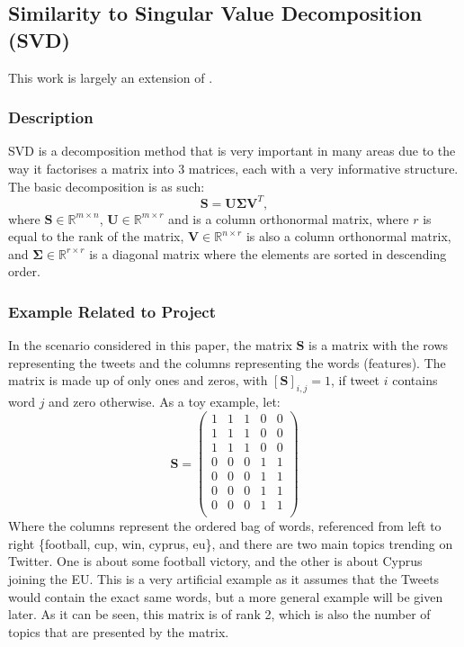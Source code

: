 \documentclass[11pt,a4paper]{article}
\begin{document}
\subsection{Similarity to Singular Value Decomposition (SVD)}
This work is largely an extension of \cite{lecture_svd}.

\subsubsection{Description}
SVD is a decomposition method that is very important in many areas due to the way it factorises a matrix into 3 matrices, each with a very informative structure. The basic decomposition is as such:
\begin{equation}
\mathbf{S} = \mathbf{U}\mathbf{\Sigma}\mathbf{V}^T,
\end{equation}
where $\mathbf{S} \in \mathbb{R}^{m \times n}$,  $\mathbf{U} \in \mathbb{R}^{m \times r}$ and is a column orthonormal matrix, where $r$ is equal to the rank of the matrix,  $\mathbf{V} \in \mathbb{R}^{n \times r}$ is also a column orthonormal matrix, and  $\mathbf{\Sigma} \in \mathbb{R}^{r \times r}$ is a diagonal matrix where the elements are sorted in descending order.

\subsubsection{Example Related to Project}
In the scenario considered in this paper, the matrix $\mathbf{S}$ is a matrix with the rows representing the tweets and the columns representing the words (features). The matrix is made up of only ones and zeros, with $[\mathbf{S}]_{i,j} = 1$, if tweet $i$ contains word $j$ and zero otherwise. As a toy example, let:
\begin{equation}
\mathbf{S} = 
\begin{pmatrix}
1 & 1 & 1 & 0 & 0\\
1 & 1 & 1 & 0 & 0\\
1 & 1 & 1 & 0 & 0\\
0 & 0 & 0 & 1 & 1\\
0 & 0 & 0 & 1 & 1\\
0 & 0 & 0 & 1 & 1\\
0 & 0 & 0 & 1 & 1\\
\end{pmatrix}
\end{equation}
Where the columns represent the ordered bag of words, referenced from left to right \{football, cup, win, cyprus, eu\}, and there are two main topics trending on Twitter. One is about some football victory, and the other is about Cyprus joining the EU. This is a very artificial example as it assumes that the Tweets would contain the exact same words, but a more general example will be given later. As it can be seen, this matrix is of rank 2, which is also the number of topics that are presented by the matrix. 
\end{document}
